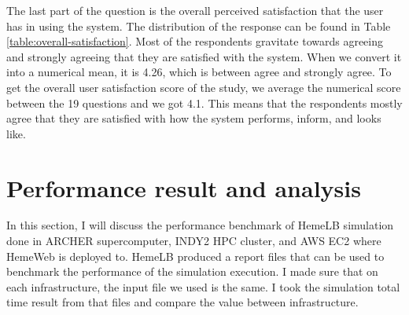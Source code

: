 \begin{center}
\label{table:overall-satisfaction}
\end{center}
\vspace{1cm}

The last part of the question is the overall perceived satisfaction that the user has in using the system. The distribution of the response can be found in Table \ref{table:overall-satisfaction}. Most of the respondents gravitate towards agreeing and strongly agreeing that they are satisfied with the system. When we convert it into a numerical mean, it is 4.26, which is between agree and strongly agree. To get the overall user satisfaction score of the study, we average the numerical score between the 19 questions and we got 4.1. This means that the respondents mostly agree that they are satisfied with how the system performs, inform, and looks like.

\section{Performance result and analysis}

In this section, I will discuss the performance benchmark of HemeLB simulation done in ARCHER supercomputer, INDY2 HPC cluster, and AWS EC2 where HemeWeb is deployed to. HemeLB produced a report files that can be used to benchmark the performance of the simulation execution. I made sure that on each infrastructure, the input file we used is the same. I took the simulation total time result from that files and compare the value between infrastructure.


